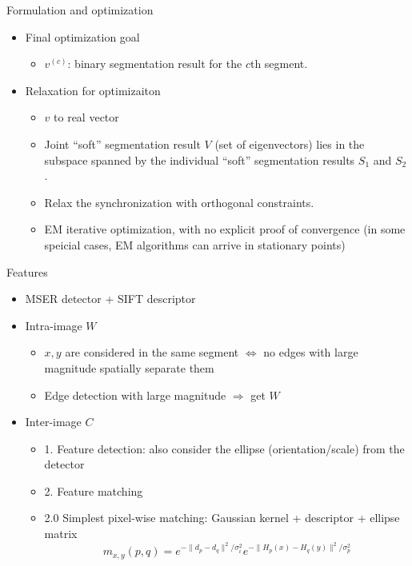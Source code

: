 \documentclass[12pt]{beamer}
\begin{document}
\begin{frame}{Formulation and optimization}
    \begin{itemize}
        \item Final optimization goal
        \begin{itemize}
            \[F(v^{(c)}, C) = \text{IntraIS}(v^{(c)}, C) + \text{InterIS}(v^{(c)}, C)\]
            \item $v^{(c)}$: binary segmentation result for the $c$th segment.
        \end{itemize}
        \item Relaxation for optimizaiton
        \begin{itemize}
            \item $v$ to real vector
            \item Joint ``soft'' segmentation result $V$ (set of eigenvectors) lies in the subspace spanned by the individual ``soft'' segmentation results $S_1$ and $S_2$.
            \item Relax the synchronization with orthogonal constraints.
            \item EM iterative optimization, with no explicit proof of convergence (in some speicial cases, EM algorithms can arrive in stationary points)
        \end{itemize}
    \end{itemize}
\end{frame}

\begin{frame}{Features}
    \begin{itemize}
        \item MSER detector + SIFT descriptor
        \item Intra-image $W$
        \begin{itemize}
            \item $x, y$ are considered in the same segment $\Leftrightarrow$ no edges with large magnitude spatially separate them
            \item Edge detection with large magnitude $\Rightarrow$ get $W$
        \end{itemize}
        \item Inter-image $C$
        \begin{itemize}
            \item 1. Feature detection: also consider the ellipse (orientation/scale) from the detector
            \item 2. Feature matching
            \item 2.0 Simplest pixel-wise matching: Gaussian kernel + descriptor + ellipse matrix
            \[m_{x, y}(p, q) = e^{-\lVert d_p - d_q \rVert^2/\sigma_i^2}e^{-\lVert H_p(x)-H_q(y)\rVert^2/\sigma_p^2}\]
        \end{itemize}
    \end{itemize}
\end{frame}
\end{document}
